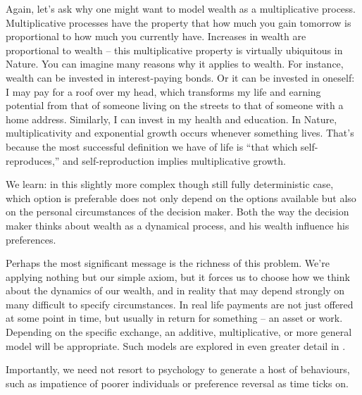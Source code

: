 Again, let's ask why one might want to model wealth as a multiplicative process. Multiplicative processes have the property that how much you gain tomorrow is proportional to how much you currently have. Increases in wealth are proportional to wealth -- this multiplicative property is virtually ubiquitous in Nature. You can imagine many reasons why it applies to wealth. For instance, wealth can be invested in interest-paying bonds. Or it can be invested in oneself: I may pay for a roof over my head, which transforms my life and earning potential from that of someone living on the streets to that of someone with a home address. Similarly, I can invest in my health and education. 
In Nature, multiplicativity and exponential growth occurs whenever something lives. That's because the most successful definition we have of life is ``that which self-reproduces,'' and self-reproduction implies multiplicative growth.

We learn: in this slightly more complex though still fully deterministic case, which option is 
preferable does not only depend on the options available but also on the personal 
circumstances of the decision maker. Both the way the decision maker thinks about wealth as a dynamical process, and his wealth influence his preferences.

Perhaps the most significant message is the richness of this problem. We're applying nothing but our simple axiom, but it forces us to choose how we think about the dynamics of our wealth, and in reality that may depend strongly on many difficult to specify circumstances. In real life payments are not just offered at some point in time, but usually in return for something -- an asset or work. Depending on the specific exchange, an additive, multiplicative, or more general model will be appropriate. Such models are explored in even greater detail in \cite{MavroyiannisETAL2019}. 

Importantly, we need not resort to psychology to generate a host of behaviours, such as impatience of poorer individuals or preference reversal as time ticks on.


